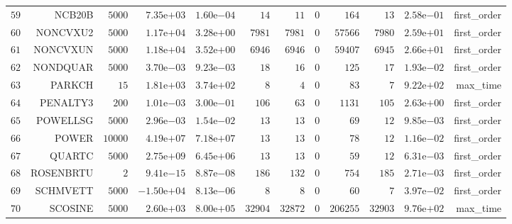 \begin{longtable}{rrrrrrrrrrrr}
  \(    59\) & NCB20B & \(  5000\) & \( 7.35\)e\(+03\) & \( 1.60\)e\(-04\) & \(    14\) & \(    11\) & \(     0\) & \(   164\) & \(    13\) & \( 2.58\)e\(-01\) & first\_order \\
  \(    60\) & NONCVXU2 & \(  5000\) & \( 1.17\)e\(+04\) & \( 3.28\)e\(+00\) & \(  7981\) & \(  7981\) & \(     0\) & \( 57566\) & \(  7980\) & \( 2.59\)e\(+01\) & first\_order \\
  \(    61\) & NONCVXUN & \(  5000\) & \( 1.18\)e\(+04\) & \( 3.52\)e\(+00\) & \(  6946\) & \(  6946\) & \(     0\) & \( 59407\) & \(  6945\) & \( 2.66\)e\(+01\) & first\_order \\
  \(    62\) & NONDQUAR & \(  5000\) & \( 3.70\)e\(-03\) & \( 9.23\)e\(-03\) & \(    18\) & \(    16\) & \(     0\) & \(   125\) & \(    17\) & \( 1.93\)e\(-02\) & first\_order \\
  \(    63\) & PARKCH & \(    15\) & \( 1.81\)e\(+03\) & \( 3.74\)e\(+02\) & \(     8\) & \(     4\) & \(     0\) & \(    83\) & \(     7\) & \( 9.22\)e\(+02\) & max\_time \\
  \(    64\) & PENALTY3 & \(   200\) & \( 1.01\)e\(-03\) & \( 3.00\)e\(-01\) & \(   106\) & \(    63\) & \(     0\) & \(  1131\) & \(   105\) & \( 2.63\)e\(+00\) & first\_order \\
  \(    65\) & POWELLSG & \(  5000\) & \( 2.96\)e\(-03\) & \( 1.54\)e\(-02\) & \(    13\) & \(    13\) & \(     0\) & \(    69\) & \(    12\) & \( 9.85\)e\(-03\) & first\_order \\
  \(    66\) & POWER & \( 10000\) & \( 4.19\)e\(+07\) & \( 7.18\)e\(+07\) & \(    13\) & \(    13\) & \(     0\) & \(    78\) & \(    12\) & \( 1.16\)e\(-02\) & first\_order \\
  \(    67\) & QUARTC & \(  5000\) & \( 2.75\)e\(+09\) & \( 6.45\)e\(+06\) & \(    13\) & \(    13\) & \(     0\) & \(    59\) & \(    12\) & \( 6.31\)e\(-03\) & first\_order \\
  \(    68\) & ROSENBRTU & \(     2\) & \( 9.41\)e\(-15\) & \( 8.87\)e\(-08\) & \(   186\) & \(   132\) & \(     0\) & \(   754\) & \(   185\) & \( 2.71\)e\(-03\) & first\_order \\
  \(    69\) & SCHMVETT & \(  5000\) & \(-1.50\)e\(+04\) & \( 8.13\)e\(-06\) & \(     8\) & \(     8\) & \(     0\) & \(    60\) & \(     7\) & \( 3.97\)e\(-02\) & first\_order \\
  \(    70\) & SCOSINE & \(  5000\) & \( 2.60\)e\(+03\) & \( 8.00\)e\(+05\) & \( 32904\) & \( 32872\) & \(     0\) & \(206255\) & \( 32903\) & \( 9.76\)e\(+02\) & max\_time \\

\end{longtable}
